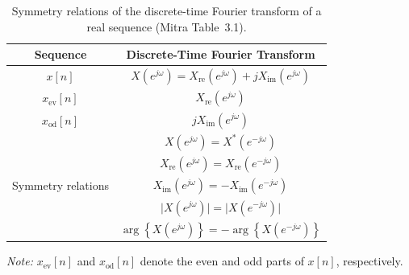 
\begin{table}[H]
\centering
\caption{Symmetry relations of the discrete-time Fourier transform of a real sequence (Mitra Table~3.1).}
\label{tab:dtft-real-symmetry}

\begin{tabular}{cc}
\toprule
\textbf{Sequence}
&
\textbf{Discrete-Time Fourier Transform}
\\
\midrule

$x[n]$
&
$X(e^{j\omega})
 = X_{\mathrm{re}}(e^{j\omega})
 + jX_{\mathrm{im}}(e^{j\omega})$
\\
\midrule

$x_{\mathrm{ev}}[n]$
&
$X_{\mathrm{re}}(e^{j\omega})$
\\

$x_{\mathrm{od}}[n]$
&
$jX_{\mathrm{im}}(e^{j\omega})$
\\
\midrule

\multirow{5}{*}{Symmetry relations}
&
$X(e^{j\omega})=X^{*}(e^{-j\omega})$
\\[1.2em]

&
$X_{\mathrm{re}}(e^{j\omega})
 =X_{\mathrm{re}}(e^{-j\omega})$
\\[1.2em]

&
$X_{\mathrm{im}}(e^{j\omega})
 =-X_{\mathrm{im}}(e^{-j\omega})$
\\[1.2em]

&
$\lvert X(e^{j\omega})\rvert
 =\lvert X(e^{-j\omega})\rvert$
\\[1.2em]

&
$\arg\!\left\{X(e^{j\omega})\right\}
 =-\arg\!\left\{X(e^{-j\omega})\right\}$
\\

\bottomrule
\end{tabular}

\medskip

\parbox{0.9\textwidth}{
\textit{Note:}
$x_{\mathrm{ev}}[n]$ and $x_{\mathrm{od}}[n]$ denote the even and
odd parts of $x[n]$, respectively.
}
\end{table}

